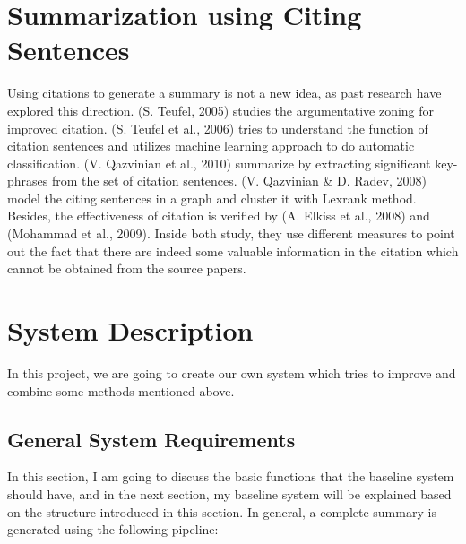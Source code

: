 \documentclass[hyp]{socreport}
\begin{document}
\section{Summarization using Citing Sentences}

  Using citations to generate a summary is not a new idea, as past
  research have explored 
this direction. (S. Teufel, 2005) studies the argumentative zoning for
improved citation. (S. Teufel et al., 2006) tries
 to understand the function of citation sentences and utilizes machine
 learning approach to do automatic classification. 
(V. Qazvinian et al., 2010) summarize by extracting significant
 key-phrases from the set of citation sentences. 
(V. Qazvinian \& D. Radev, 2008) model the citing sentences in a graph
 and cluster it with Lexrank method. Besides, 
the effectiveness of citation is verified by  (A. Elkiss et al., 2008)
and (Mohammad et al., 2009). Inside both study, 
they use different measures to point out the fact that there are
indeed some valuable information in the citation which 
cannot be obtained from the source papers. 


\section{System Description}

In this project, we are going to create our own system which tries to
improve 
and combine some methods mentioned above.

\subsection{General System Requirements}

  In this section, I am going to discuss the basic functions that the
  baseline system should have, and in the next section, 
my baseline system will be explained based on the structure introduced
in this section. In general, a complete summary 
is generated using the following pipeline:
\end{document}
